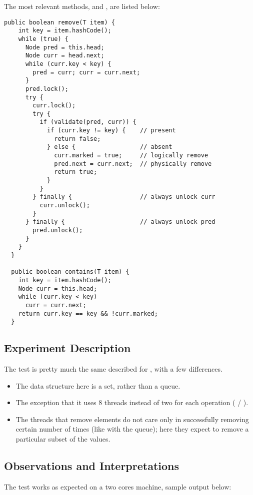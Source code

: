 The most relevant methods,  and , are listed
below: \\

\begin{lstlisting}[style=numbers]
  public boolean remove(T item) {
    int key = item.hashCode();
    while (true) {
      Node pred = this.head;
      Node curr = head.next;
      while (curr.key < key) {
        pred = curr; curr = curr.next;
      }
      pred.lock();
      try {
        curr.lock();
        try {
          if (validate(pred, curr)) {
            if (curr.key != key) {    // present
              return false;
            } else {                  // absent
              curr.marked = true;     // logically remove
              pred.next = curr.next;  // physically remove
              return true;
            }
          }
        } finally {                   // always unlock curr
          curr.unlock();
        }
      } finally {                     // always unlock pred
        pred.unlock();
      }
    }
  }

  public boolean contains(T item) {
    int key = item.hashCode();
    Node curr = this.head;
    while (curr.key < key)
      curr = curr.next;
    return curr.key == key && !curr.marked;
  }
\end{lstlisting}
\hfill

\subsection{Experiment Description}
The test is pretty much the same described for ,
with a few differences.

\begin{itemize}
\item The data structure here is a set, rather than a queue.
\item The exception that it uses 8 threads instead of two for each
  operation ( / ).
\item The threads that remove elements do not care only in
  successfully removing certain number of times (like with the queue);
  here they expect to remove a particular subset of the values.
\end{itemize}
  

\subsection{Observations and Interpretations}

The test works as expected on a two cores machine, sample output below:

